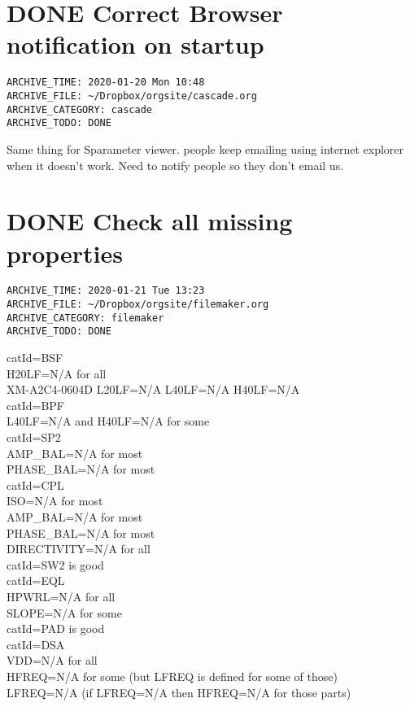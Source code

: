\documentclass[11pt]{article}
\begin{document}
\section*{{\bfseries\sffamily DONE}  Correct Browser notification on startup}
\label{sec:org0400cad}
\begin{verbatim}
ARCHIVE_TIME: 2020-01-20 Mon 10:48
ARCHIVE_FILE: ~/Dropbox/orgsite/cascade.org
ARCHIVE_CATEGORY: cascade
ARCHIVE_TODO: DONE
\end{verbatim}
Same thing for Sparameter viewer. people keep emailing using internet explorer when it doesn't work. Need to notify people so they don't email us.\\

\section*{{\bfseries\sffamily DONE}  Check all missing properties}
\label{sec:org867576d}
\begin{verbatim}
ARCHIVE_TIME: 2020-01-21 Tue 13:23
ARCHIVE_FILE: ~/Dropbox/orgsite/filemaker.org
ARCHIVE_CATEGORY: filemaker
ARCHIVE_TODO: DONE
\end{verbatim}
catId=BSF\\
  H20LF=N/A for all\\
  XM-A2C4-0604D L20LF=N/A L40LF=N/A H40LF=N/A\\
catId=BPF\\
  L40LF=N/A and H40LF=N/A for some\\
catId=SP2\\
  AMP\_BAL=N/A for most\\
  PHASE\_BAL=N/A for most\\
catId=CPL\\
  ISO=N/A for most\\
  AMP\_BAL=N/A for most\\
  PHASE\_BAL=N/A for most\\
  DIRECTIVITY=N/A for all\\
catId=SW2 is good\\
catId=EQL\\
  HPWRL=N/A for all\\
  SLOPE=N/A for some\\
catId=PAD is good\\
catId=DSA\\
  VDD=N/A for all\\
  HFREQ=N/A for some (but LFREQ is defined for some of those)\\
  LFREQ=N/A (if LFREQ=N/A then HFREQ=N/A for those parts)\\
\end{document}

